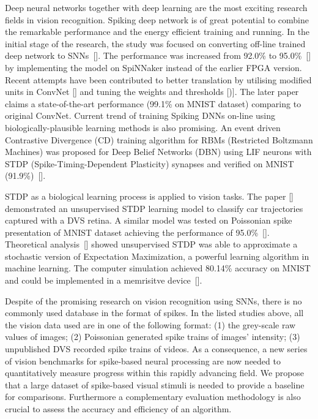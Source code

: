 Deep neural networks together with deep learning are the most exciting research fields in vision recognition.
Spiking deep network is of great potential to combine the remarkable performance and the energy efficient training and running.
In the initial stage of the research, the study was focused on converting off-line trained deep network to SNNs~[\cite{o2013real}].
The performance was increased from 92.0\% to 95.0\%~[\cite{Stromatias2015scalable}] by implementing the model on SpiNNaker instead of the earlier FPGA version.
Recent attempts have been contributed to better translation by utilising modified units in ConvNet [\cite{cao2015spiking}] and tuning the weights and thresholds [\cite{Diehl2015fast})].
The later paper claims a state-of-the-art performance (99.1\% on MNIST dataset) comparing to original ConvNet.
Current trend of training Spiking DNNs on-line using biologically-plausible learning methods is also promising.
An event driven Contrastive Divergence (CD) training algorithm for RBMs (Restricted Boltzmann Machines) was proposed for Deep Belief Networks (DBN) using LIF neurons with STDP (Spike-Timing-Dependent Plasticity) synapses and verified on MNIST (91.9\%)~[\cite{neftci2013event}].

STDP as a biological learning process is applied to vision tasks.
The paper [\cite{bichler2012extraction}] demonstrated an unsupervised STDP learning model to classify car trajectories captured with a DVS retina. 
A similar model was tested on Poissonian spike presentation of MNIST dataset achieving the performance of 95.0\%~[\cite{Diehl2015unsupervised}].
Theoretical analysis~[\cite{nessler2013bayesian}] showed unsupervised STDP was able to approximate a stochastic version of Expectation Maximization, a powerful learning algorithm in machine learning.
The computer simulation achieved 80.14\% accuracy on MNIST and could be implemented in a memrisitve device~[\cite{bill2014compound}]. 

Despite of the promising research on vision recognition using SNNs, there is no commonly used database in the format of spikes.
In the listed studies above, all the vision data used are in one of the following format:
(1) the grey-scale raw values of images;
(2) Poissonian generated spike trains of images' intensity;
(3) unpublished DVS recorded spike trains of videos.
As a consequence, a new series of vision benchmarks for spike-based neural processing are now needed to quantitatively measure progress within this rapidly advancing field.
We propose that a large dataset of spike-based visual stimuli is needed to provide a baseline for comparisons.
Furthermore a complementary evaluation methodology is also crucial to assess the accuracy and efficiency of an algorithm.

